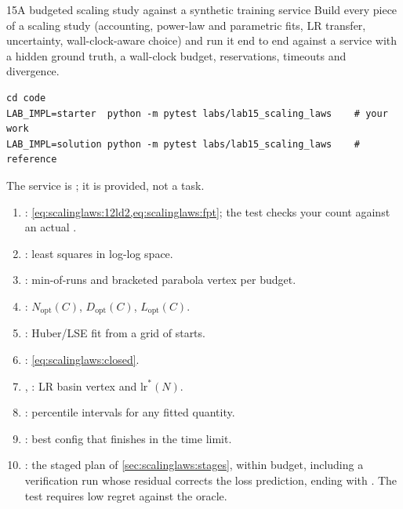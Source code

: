 \begin{labbox}{15}{A budgeted scaling study against a synthetic training service}
Build every piece of a scaling study (accounting, power-law and parametric fits, LR transfer,
uncertainty, wall-clock-aware choice) and run it end to end against a service with a hidden
ground truth, a wall-clock budget, reservations, timeouts and divergence.

\begin{lstlisting}[style=shell]
cd code
LAB_IMPL=starter  python -m pytest labs/lab15_scaling_laws    # your work
LAB_IMPL=solution python -m pytest labs/lab15_scaling_laws    # reference
\end{lstlisting}
The service is ; it is provided, not a task.

\begin{enumerate}
\item {}: \cref{eq:scalinglaws:12ld2,eq:scalinglaws:fpt}; the
      test checks your count against an actual .
\item {}: least squares in log-log space.
\item {}: min-of-runs and bracketed parabola vertex per budget.
\item {}: $N_{\text{opt}}(C)$, $D_{\text{opt}}(C)$, $L_{\text{opt}}(C)$.
\item {}: Huber/LSE fit from a grid of starts.
\item {}: \cref{eq:scalinglaws:closed}.
\item {}, : LR basin vertex and $\text{lr}^*(N)$.
\item {}: percentile intervals for any fitted quantity.
\item {}: best config that finishes in the time limit.
\item {}: the staged plan of \cref{sec:scalinglaws:stages}, within budget,
      including a verification run whose residual corrects the loss prediction, ending with
      . The test requires low regret against the oracle.
\end{enumerate}


\end{labbox}
